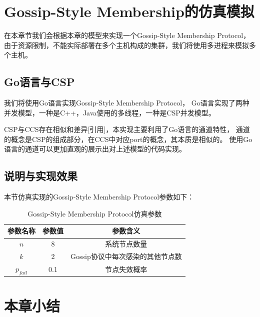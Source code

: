 \section{Gossip-Style Membership的仿真模拟}
在本章节我们会根据本章的模型来实现一个Gossip-Style Membership Protocol，
由于资源限制，不能实际部署在多个主机构成的集群，我们将使用多进程来模拟多个主机。

\subsection{Go语言与CSP}
我们将使用Go语言实现Gossip-Style Membership Protocol，
Go语言实现了两种并发模型，一种是C++，Java使用的多线程，一种是CSP并发模型。

CSP与CCS存在相似和差异[引用]，本实现主要利用了Go语言的通道特性，
通道的概念是CSP的组成部分，在CCS中对应port的概念，其本质是相似的。
使用Go语言的通道可以更加直观的展示出对上述模型的代码实现。

\subsection{说明与实现效果}
本节仿真实现的Gossip-Style Membership Protocol参数如下：
\begin{table}[!hpt]
   \caption[Gossip-Style Membership Protocol仿真参数]{Gossip-Style Membership Protocol仿真参数\footnotemark}
   \label{tab:thirdone}
   \centering
   \begin{tabular}{@{}ccc@{}} \toprule
     参数名称 & 参数值 & 参数含义 \\ \midrule
     $n$ & 8 & 系统节点数量\\
     $k$ & 2 & Gossip协议中每次感染的其他节点数\\
     $p_{fail}$ & 0.1 & 节点失效概率\\ \bottomrule
   \end{tabular}
 \end{table}

 \section{本章小结}